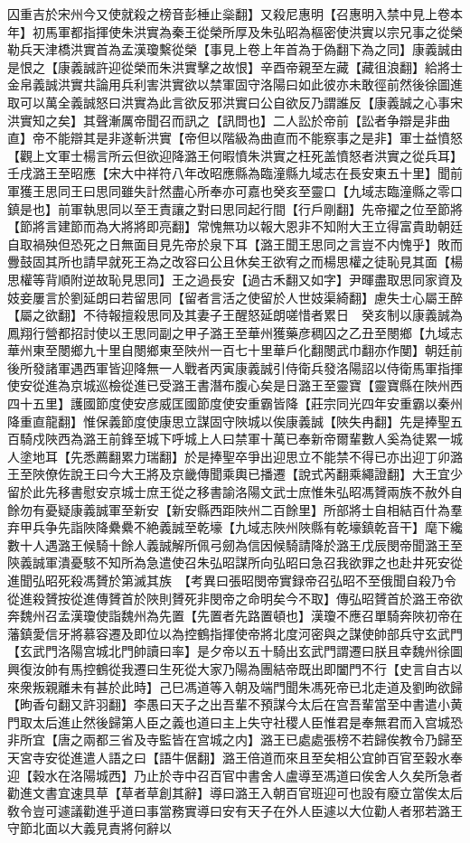 囚重吉於宋州今又使就殺之榜音彭棰止橤翻】又殺尼惠明【召惠明入禁中見上卷本年】初馬軍都指揮使朱洪實為秦王從榮所厚及朱弘昭為樞密使洪實以宗兄事之從榮勒兵天津橋洪實首為孟漢瓊繫從榮【事見上卷上年首為于偽翻下為之同】康義誠由是恨之【康義誠許迎從榮而朱洪實擊之故恨】辛酉帝親至左藏【藏徂浪翻】給將士金帛義誠洪實共論用兵利害洪實欲以禁軍固守洛陽曰如此彼亦未敢徑前然後徐圖進取可以萬全義誠怒曰洪實為此言欲反邪洪實曰公自欲反乃謂誰反【康義誠之心事宋洪實知之矣】其聲漸厲帝聞召而訊之【訊問也】二人訟於帝前【訟者争辯是非曲直】帝不能辯其是非遂斬洪實【帝但以階級為曲直而不能察事之是非】軍士益憤怒【觀上文軍士楊言所云但欲迎降潞王何暇憤朱洪實之枉死盖憤怒者洪實之從兵耳】壬戌潞王至昭應【宋大中祥符八年改昭應縣為臨潼縣九域志在長安東五十里】聞前軍獲王思同王曰思同雖失計然盡心所奉亦可嘉也癸亥至靈口【九域志臨潼縣之零口鎮是也】前軍執思同以至王責讓之對曰思同起行間【行戶剛翻】先帝擢之位至節將【節將言建節而為大將將即亮翻】常愧無功以報大恩非不知附大王立得富貴助朝廷自取禍殃但恐死之日無面目見先帝於泉下耳【潞王聞王思同之言豈不内愧乎】敗而釁鼓固其所也請早就死王為之改容曰公且休矣王欲宥之而楊思權之徒恥見其面【楊思權等背順附逆故恥見思同】王之過長安【過古禾翻又如字】尹暉盡取思同家資及妓妾屢言於劉延朗曰若留思同【留者言活之使留於人世妓渠綺翻】慮失士心屬王醉【屬之欲翻】不待報擅殺思同及其妻子王醒怒延朗嗟惜者累日　癸亥制以康義誠為鳳翔行營都招討使以王思同副之甲子潞王至華州獲藥彦稠囚之乙丑至閿鄉【九域志華州東至閿鄉九十里自閿鄉東至陜州一百七十里華戶化翻閿武巾翻亦作閺】朝廷前後所發諸軍遇西軍皆迎降無一人戰者丙寅康義誠引侍衛兵發洛陽詔以侍衛馬軍指揮使安從進為京城巡檢從進已受潞王書潛布腹心矣是日潞王至靈寶【靈寶縣在陜州西四十五里】護國節度使安彦威匡國節度使安重霸皆降【莊宗同光四年安重霸以秦州降重直龍翻】惟保義節度使康思立謀固守陜城以俟康義誠【陜失冉翻】先是捧聖五百騎戍陜西為潞王前鋒至城下呼城上人曰禁軍十萬已奉新帝爾輩數人奚為徒累一城人塗地耳【先悉薦翻累力瑞翻】於是捧聖卒爭出迎思立不能禁不得已亦出迎丁卯潞王至陜僚佐說王曰今大王將及京畿傳聞乘輿已播遷【說式芮翻乘繩證翻】大王宜少留於此先移書慰安京城士庶王從之移書諭洛陽文武士庶惟朱弘昭馮贇兩族不赦外自餘勿有憂疑康義誠軍至新安【新安縣西距陜州二百餘里】所部將士自相結百什為羣弃甲兵争先詣陜降纍纍不絶義誠至乾壕【九域志陜州陜縣有乾壕鎮乾音干】麾下纔數十人遇潞王候騎十餘人義誠解所佩弓劒為信因候騎請降於潞王戊辰閔帝聞潞王至陝義誠軍潰憂駭不知所為急遣使召朱弘昭謀所向弘昭曰急召我欲罪之也赴井死安從進聞弘昭死殺馮贇於第滅其族　【考異曰張昭閔帝實録帝召弘昭不至俄聞自殺乃令從進殺贇按從進傳贇首於陜則贇死非閔帝之命明矣今不取】傳弘昭贇首於潞王帝欲奔魏州召孟漢瓊使詣魏州為先置【先置者先路置頓也】漢瓊不應召單騎奔陜初帝在藩鎮愛信牙將慕容遷及即位以為控鶴指揮使帝將北度河密與之謀使帥部兵守玄武門【玄武門洛陽宫城北門帥讀曰率】是夕帝以五十騎出玄武門謂遷曰朕且幸魏州徐圖興復汝帥有馬控鶴從我遷曰生死從大家乃陽為團結帝既出即闔門不行【史言自古以來衆叛親離未有甚於此時】己巳馮道等入朝及端門聞朱馮死帝已北走道及劉昫欲歸【昫香句翻又許羽翻】李愚曰天子之出吾輩不預謀今太后在宫吾輩當至中書遣小黄門取太后進止然後歸第人臣之義也道曰主上失守社稷人臣惟君是奉無君而入宫城恐非所宜【唐之兩都三省及寺監皆在宫城之内】潞王已處處張榜不若歸俟教令乃歸至天宮寺安從進遣人語之曰【語牛倨翻】潞王倍道而來且至矣相公宜帥百官至穀水奉迎【穀水在洛陽城西】乃止於寺中召百官中書舍人盧導至馮道曰俟舍人久矣所急者勸進文書宜速具草【草者草創其辭】導曰潞王入朝百官班迎可也設有廢立當俟太后敎令豈可遽議勸進乎道曰事當務實導曰安有天子在外人臣遽以大位勸人者邪若潞王守節北面以大義見責將何辭以